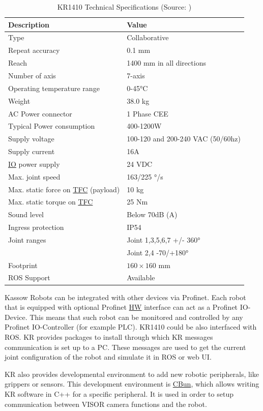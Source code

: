 \begin{table}[h!]
    \centering
    \small
    \renewcommand{\arraystretch}{1.2} %
    \begin{tabular}{ll}
        \textbf{Description} & \textbf{Value} \\ \hline
        Type & Collaborative \\
        Repeat accuracy & 0.1 mm \\
        Reach & 1400 mm in all directions\\
        Number of axis & 7-axis \\
        Operating temperature range & 0-45°C\\ 
        Weight & 38.0 kg \\ 
        AC Power connector & 1 Phase CEE \\ 
        Typical Power consumption & 400-1200W \\ 
        Supply voltage & 100-120 and 200-240 VAC (50/60hz) \\ 
        Supply current & 16A\\ 
        \hyperref[acro:IO]{IO} power supply & 24 VDC\\ 
        Max. joint speed  & 163/225 °/s\\ 
        Max. static force on \hyperref[acro:TFC]{TFC} (payload) & 10 kg\\ 
        Max. static torque on \hyperref[acro:TFC]{TFC} & 25 Nm\\ 
        Sound level & Below 70dB (A) \\ 
        Ingress protection & IP54 \\ 
        Joint ranges & Joint 1,3,5,6,7 +/- 360° \\
        & Joint 2,4 -70/+180° \\ 
        Footprint& $160 \times 160$ mm \\ 
        ROS Support & Available \\ \hline
    \end{tabular}
    \caption{KR1410 Technical Specifications (Source: \cite[page 31]{kassow-specification})}
\end{table}


Kassow Robots can be integrated with other devices via Profinet. Each robot that is equipped with optional Profinet 
\hyperref[acro:HW]{HW} interface can act as a Profinet IO-Device.
This means that such robot can be monitored and controlled by any Profinet IO-Controller (for example PLC). \cite{profinet}
KR1410 could be also interfaced with ROS. KR provides packages to install through which KR messages communication is set up to a PC.
These messages are used to get the current joint configuration of the robot and simulate it in ROS or web UI. \cite{kassow-ros}

KR also provides developmental environment to add new robotic peripherals, like grippers or sensors. This development environment is \hyperref[acro:CBun]{CBun},
which allows writing KR software in C++ for a specific peripheral. It is used in order to setup communication between VISOR camera functions and the robot. \cite{Cbun}
